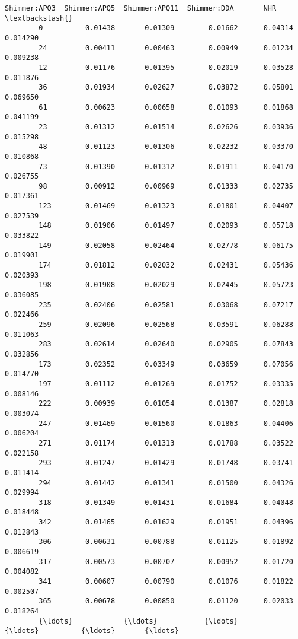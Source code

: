 \documentclass[11pt]{article}
\begin{document}
\begin{Verbatim}[commandchars=\\\{\}]
              Shimmer:APQ3  Shimmer:APQ5  Shimmer:APQ11  Shimmer:DDA       NHR  \textbackslash{}
        0          0.01438       0.01309        0.01662      0.04314  0.014290   
        24         0.00411       0.00463        0.00949      0.01234  0.009238   
        12         0.01176       0.01395        0.02019      0.03528  0.011876   
        36         0.01934       0.02627        0.03872      0.05801  0.069650   
        61         0.00623       0.00658        0.01093      0.01868  0.041199   
        23         0.01312       0.01514        0.02626      0.03936  0.015298   
        48         0.01123       0.01306        0.02232      0.03370  0.010868   
        73         0.01390       0.01312        0.01911      0.04170  0.026755   
        98         0.00912       0.00969        0.01333      0.02735  0.017361   
        123        0.01469       0.01323        0.01801      0.04407  0.027539   
        148        0.01906       0.01497        0.02093      0.05718  0.033822   
        149        0.02058       0.02464        0.02778      0.06175  0.019901   
        174        0.01812       0.02032        0.02431      0.05436  0.020393   
        198        0.01908       0.02029        0.02445      0.05723  0.036085   
        235        0.02406       0.02581        0.03068      0.07217  0.022466   
        259        0.02096       0.02568        0.03591      0.06288  0.011063   
        283        0.02614       0.02640        0.02905      0.07843  0.032856   
        173        0.02352       0.03349        0.03659      0.07056  0.014770   
        197        0.01112       0.01269        0.01752      0.03335  0.008146   
        222        0.00939       0.01054        0.01387      0.02818  0.003074   
        247        0.01469       0.01560        0.01863      0.04406  0.006204   
        271        0.01174       0.01313        0.01788      0.03522  0.022158   
        293        0.01247       0.01429        0.01748      0.03741  0.011414   
        294        0.01442       0.01341        0.01500      0.04326  0.029994   
        318        0.01349       0.01431        0.01684      0.04048  0.018448   
        342        0.01465       0.01629        0.01951      0.04396  0.012843   
        306        0.00631       0.00788        0.01125      0.01892  0.006619   
        317        0.00573       0.00707        0.00952      0.01720  0.004082   
        341        0.00607       0.00790        0.01076      0.01822  0.002507   
        365        0.00678       0.00850        0.01120      0.02033  0.018264   
        {\ldots}            {\ldots}           {\ldots}            {\ldots}          {\ldots}       {\ldots}   

\end{Verbatim}
\end{document}
